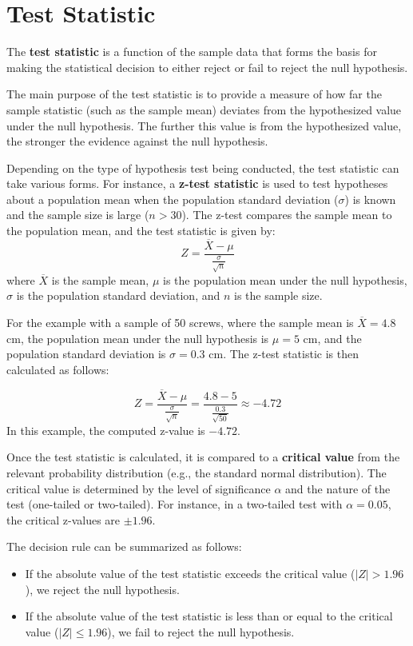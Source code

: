 \documentclass[twoside]{book}
\begin{document}
\section{Test Statistic}
\begin{textbox}
The \textbf{test statistic} is a function of the sample data that forms the basis for making the statistical decision to either reject or fail to reject the null hypothesis.
\end{textbox}

The main purpose of the test statistic is to provide a measure of how far the sample statistic (such as the sample mean) deviates from the hypothesized value under the null hypothesis. The further this value is from the hypothesized value, the stronger the evidence against the null hypothesis.

Depending on the type of hypothesis test being conducted, the test statistic can take various forms. For instance, a \textbf{z-test statistic} is used to test hypotheses about a population mean when the population standard deviation ($\sigma$) is known and the sample size is large ($n > 30$). The z-test compares the sample mean to the population mean, and the test statistic is given by:
    \[
    Z = \frac{\overline{X} - \mu}{\frac{\sigma}{\sqrt{n}}}
    \]
    where $\overline{X}$ is the sample mean, $\mu$ is the population mean under the null hypothesis, $\sigma$ is the population standard deviation, and $n$ is the sample size.

For the example with a sample of 50 screws, where the sample mean is $\overline{X} = 4.8$ cm, the population mean under the null hypothesis is $\mu = 5$ cm, and the population standard deviation is $\sigma = 0.3$ cm. The z-test statistic is then calculated as follows:

\[
Z = \frac{\overline{X} - \mu}{\frac{\sigma}{\sqrt{n}}} = \frac{4.8 - 5}{\frac{0.3}{\sqrt{50}}} \approx -4.72
\]
In this example, the computed z-value is $-4.72$. 

Once the test statistic is calculated, it is compared to a \textbf{critical value} from the relevant probability distribution (e.g., the standard normal distribution). The critical value is determined by the level of significance $\alpha$ and the nature of the test (one-tailed or two-tailed). For instance, in a two-tailed test with $\alpha = 0.05$, the critical z-values are $\pm 1.96$.

The decision rule can be summarized as follows:

\begin{itemize}
    \item If the absolute value of the test statistic exceeds the critical value ($\left|Z\right| > 1.96$), we reject the null hypothesis.
    \item If the absolute value of the test statistic is less than or equal to the critical value ($\left|Z\right| \leq 1.96$), we fail to reject the null hypothesis.
\end{itemize}
\end{document}
